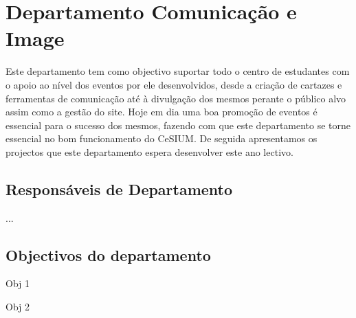 \section{Departamento Comunicação e Image}

\indent	Este departamento tem como objectivo suportar todo o centro de estudantes com o apoio ao nível dos eventos por ele desenvolvidos, desde a criação de cartazes e ferramentas de comunicação até à divulgação dos mesmos perante o público alvo assim como a gestão do site. Hoje em dia uma boa promoção de eventos é essencial para o sucesso dos mesmos, fazendo com que este departamento se torne essencial no bom funcionamento do CeSIUM. De seguida apresentamos os projectos que este departamento espera desenvolver este ano lectivo.\\

\subsection{Responsáveis de Departamento}
\begin{itemizedash}
	\item ...
\end{itemizedash}

\subsection{Objectivos do departamento}
\lipsum[2]
\begin{itemizedash}
	\item Obj 1
	\item Obj 2
\end{itemizedash}
